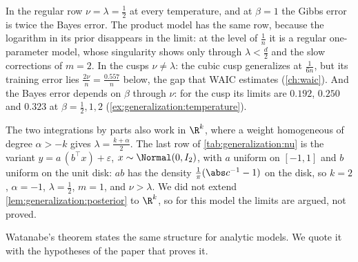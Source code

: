 \begin{refsection}
In the regular row $\nu=\lambda=\frac12$ at every temperature, and at $\beta=1$ the Gibbs error is twice the Bayes error. The product model has the same row, because the logarithm in its prior disappears in the limit: at the level of $\frac1n$ it is a regular one-parameter model, whose singularity shows only through $\lambda<\frac d2$ and the slow corrections of $m=2$. In the cusps $\nu\ne\lambda$: the cubic cusp generalizes at $\frac1{6n}$, but its training error lies $\frac{2\nu}n=\frac{0.557}n$ below, the gap that WAIC estimates (\cref{ch:waic}). And the Bayes error depends on $\beta$ through $\nu$: for the cusp its limits are $0.192$, $0.250$ and $0.323$ at $\beta=\frac12,1,2$ (\cref{ex:generalization:temperature}).

The two integrations by parts also work in $\R^k$, where a weight homogeneous of degree $\alpha>-k$ gives $\lambda=\frac{k+\alpha}2$. The last row of \cref{tab:generalization:nu} is the variant $y=a\,(b^\top x)+\varepsilon$, $x\sim\Normal(0,I_2)$, with $a$ uniform on $[-1,1]$ and $b$ uniform on the unit disk: $ab$ has the density $\frac1\pi(\abs c^{-1}-1)$ on the disk, so $k=2$, $\alpha=-1$, $\lambda=\frac12$, $m=1$, and $\nu>\lambda$. We did not extend \cref{lem:generalization:posterior} to $\R^k$, so for this model the limits are argued, not proved.

Watanabe's theorem states the same structure for analytic models. We quote it with the hypotheses of the paper that proves it.


\end{refsection}
